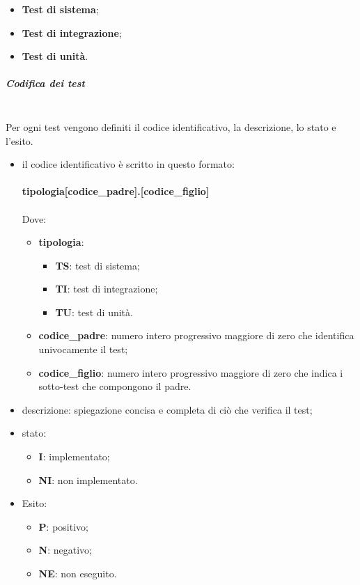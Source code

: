 \begin{itemize}
	\item \textbf{Test di sistema};
	\item \textbf{Test di integrazione};
	\item \textbf{Test di unità}.
\end{itemize}
\subparagraph*{Codifica dei test} \mbox{} \\ [1mm]
Per ogni test vengono definiti il codice identificativo, la descrizione, lo stato e l'esito.
\begin{itemize}
	\item il codice identificativo è scritto in questo formato:\\
	\\ \textbf{tipologia[codice\_padre].[codice\_figlio]} \\
	\\ Dove:
	\begin{itemize}
		\item \textbf{tipologia}:
		\begin{itemize}
			\item \textbf{TS}: test di sistema;
			\item \textbf{TI}: test di integrazione;
			\item \textbf{TU}: test di unità.
		\end{itemize}
		\item \textbf{codice\_padre}: numero intero progressivo maggiore di zero che identifica univocamente il test;
		\item \textbf{codice\_figlio}: numero intero progressivo maggiore di zero che indica i sotto-test che compongono il padre. 
	\end{itemize}
	\item descrizione: spiegazione concisa e completa di ciò che verifica il test;
	\item stato:
	\begin{itemize}
		\item \textbf{I}: implementato;
		\item \textbf{NI}: non implementato.
	\end{itemize}
	\item Esito:
	\begin{itemize}
		\item \textbf{P}: positivo;
		\item \textbf{N}: negativo;
		\item \textbf{NE}: non eseguito.
	\end{itemize}
\end{itemize}

